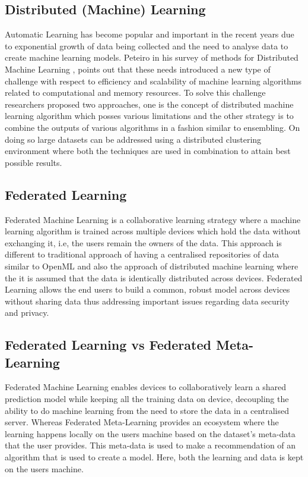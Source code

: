 \subsection*{Distributed (Machine) Learning}
Automatic Learning has become popular and important in the recent years due to exponential growth of data being collected and the need to analyse data to create machine learning models. Peteiro in his survey of methods for Distributed Machine Learning \citep{disml}, points out that these needs introduced a new type of challenge with respect to efficiency and scalability of machine learning algorithms related to computational and memory resources. To solve this challenge researchers proposed two approaches, one is the concept of distributed machine learning algorithm which posses various limitations and the other strategy is to combine the outputs of various algorithms in a fashion similar to ensembling. On doing so large datasets can be addressed using a distributed clustering environment where both the techniques are used in combination to attain best possible results.

\subsection*{Federated Learning}
Federated Machine Learning \citep{fedml-google} is a collaborative learning strategy where a machine learning algorithm is trained across multiple devices which hold the data without exchanging it, i.e, the users remain the owners of the data. This approach is different to traditional approach of having a centralised repositories of data similar to OpenML \citep{OpenML2013} and also the approach of distributed machine learning where the it is assumed that the data is identically distributed across devices. Federated Learning allows the end users to build a common, robust model across devices without sharing data thus addressing important issues regarding data security and privacy.

\subsection*{Federated Learning vs Federated Meta-Learning}

Federated Machine Learning enables devices to collaboratively learn a shared prediction model while keeping all the training data on device, decoupling the ability to do machine learning from the need to store the data in a centralised server. Whereas Federated Meta-Learning provides an ecosystem where the learning happens locally on the users machine based on the dataset's meta-data that the user provides. This meta-data is used to make a recommendation of an algorithm that is used to create a model. Here, both the learning and data is kept on the users machine.


